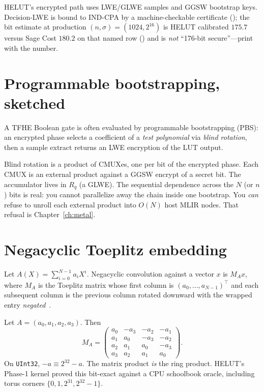 HELUT's encrypted path uses LWE/GLWE samples and GGSW bootstrap keys.
Decision-LWE is bound to IND-CPA by a machine-checkable certificate
(); the bit estimate at production $(n,\sigma)=(1024,2^{16})$ is
HELUT calibrated $175.7$ versus Sage Cost $180.2$ on that named row
() and is \emph{not} ``176-bit secure''---print  with the number.

\section{Programmable bootstrapping, sketched}

A TFHE Boolean gate is often evaluated by programmable bootstrapping (PBS):
an encrypted phase selects a coefficient of a \emph{test polynomial} via
\emph{blind rotation}, then a sample extract returns an LWE encryption of the
LUT output.

Blind rotation is a product of CMUXes, one per bit of the encrypted phase.
Each CMUX is an external product against a GGSW encrypt of a secret bit.
The accumulator lives in $R_q$ (a GLWE).
The sequential dependence across the $N$ (or $n$) bits is real: you cannot
parallelize away the chain inside one bootstrap.
You \emph{can} refuse to unroll each external product into $O(N)$ host MLIR
nodes. That refusal is Chapter~\ref{ch:metal}.

\section{Negacyclic Toeplitz embedding}

Let $A(X)=\sum_{i=0}^{N-1}a_i X^i$.
Negacyclic convolution against a vector $x$ is $M_A x$, where $M_A$ is the
Toeplitz matrix whose first column is $(a_0,\ldots,a_{N-1})^\top$ and each
subsequent column is the previous column rotated downward with the wrapped
entry \emph{negated}~\cite{lyubashevsky2010ideal}.

\begin{example}[$N=4$ by hand]
Let $A=(a_0,a_1,a_2,a_3)$. Then
\[
M_A
=
\begin{pmatrix}
a_0 & -a_3 & -a_2 & -a_1 \\
a_1 &  a_0 & -a_3 & -a_2 \\
a_2 &  a_1 &  a_0 & -a_3 \\
a_3 &  a_2 &  a_1 &  a_0
\end{pmatrix}.
\]
On \texttt{UInt32}, $-a\equiv 2^{32}-a$. The matrix product \emph{is} the
ring product. HELUT's Phase-1 kernel proved this bit-exact against a CPU
schoolbook oracle, including torus corners $\{0,1,2^{31},2^{32}-1\}$.
\end{example}


